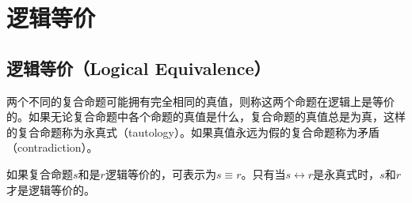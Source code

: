 \newpage

\section{逻辑等价}

\subsection{逻辑等价（Logical Equivalence）}

两个不同的复合命题可能拥有完全相同的真值，则称这两个命题在逻辑上是等价的。如果无论复合命题中各个命题的真值是什么，复合命题的真值总是为真，这样的复合命题称为永真式（tautology）。如果真值永远为假的复合命题称为矛盾（contradiction）。

\begin{table}[H]
	\centering
	\caption{逻辑等价}
\end{table}

如果复合命题$ s $和是$ r $逻辑等价的，可表示为$ s \equiv r $。只有当$ s \leftrightarrow r $是永真式时，$ s $和$ r $才是逻辑等价的。

